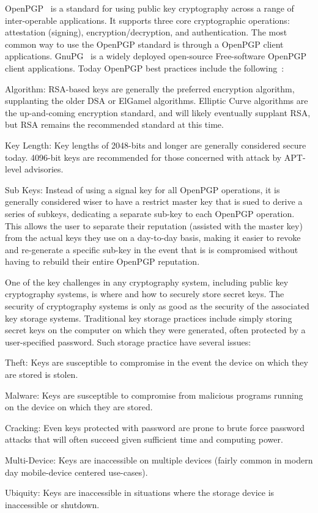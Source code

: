 \documentclass[11pt, twocolumn]{article}
\newenvironment{packed_desc}{
\begin{description}
  \setlength{\itemsep}{1pt}
  \setlength{\parskip}{0pt}
  \setlength{\parsep}{0pt}
}{\end{description}}
\begin{document}
OpenPGP~\cite{openpgp, rfc4880} is a standard for using public key
cryptography across a range of inter-operable applications. It
supports three core cryptographic operations: attestation (signing),
encryption/decryption, and authentication. The most common way to use
the OpenPGP standard is through a OpenPGP client
applications. GnuPG~\cite{gnupg} is a widely deployed open-source
Free-software OpenPGP client applications. Today OpenPGP best
practices include the following~\cite{matt-openpgp}:

\begin{packed_desc}
\item{Algorithm:} RSA-based keys are generally the preferred
  encryption algorithm, supplanting the older DSA or ElGamel
  algorithms. Elliptic Curve algorithms are the up-and-coming
  encryption standard, and will likely eventually supplant RSA, but
  RSA remains the recommended standard at this time.
\item{Key Length:} Key lengths of 2048-bits and longer are generally
  considered secure today. 4096-bit keys are recommended for those
  concerned with attack by APT-level advisories.
\item{Sub Keys:} Instead of using a signal key for all OpenPGP
  operations, it is generally considered wiser to have a restrict
  master key that is sued to derive a series of subkeys, dedicating a
  separate sub-key to each OpenPGP operation. This allows the user to
  separate their reputation (assisted with the master key) from the
  actual keys they use on a day-to-day basis, making it easier to
  revoke and re-generate a specific sub-key in the event that is is
  compromised without having to rebuild their entire OpenPGP
  reputation.
\end{packed_desc}

One of the key challenges in any cryptography system, including public
key cryptography systems, is where and how to securely store secret
keys. The security of cryptography systems is only as good as the
security of the associated key storage systems. Traditional key
storage practices include simply storing secret keys on the computer
on which they were generated, often protected by a user-specified
password. Such storage practice have several issues:

\begin{packed_desc}
\item{Theft:} Keys are susceptible to compromise in the event the device on
  which they are stored is stolen.
\item{Malware:} Keys are susceptible to compromise from malicious programs
  running on the device on which they are stored.
\item{Cracking:} Even keys protected with password are prone to brute force
  password attacks that will often succeed given sufficient time and
  computing power.
\item{Multi-Device:} Keys are inaccessible on multiple devices (fairly common in
  modern day mobile-device centered use-cases).
\item{Ubiquity:} Keys are inaccessible in situations where the storage device is
  inaccessible or shutdown.
\end{packed_desc}
\end{document}
